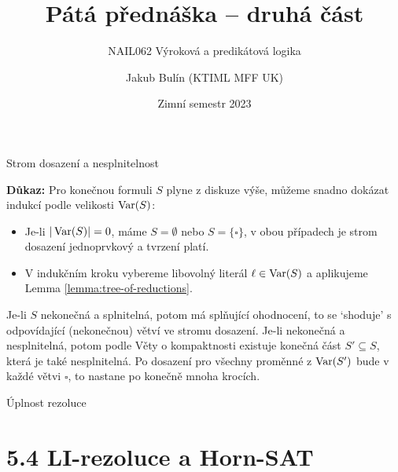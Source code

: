 \documentclass{beamer}
\title{Pátá přednáška -- druhá část}
\subtitle{NAIL062 Výroková a predikátová logika}
\author{Jakub Bulín (KTIML MFF UK)}
\date{Zimní semestr 2023}
\begin{document}
\begin{frame}{Strom dosazení a nesplnitelnost}
    


    \textbf{Důkaz:} 
        Pro konečnou formuli $S$ plyne z diskuze výše, můžeme snadno dokázat indukcí podle velikosti $\operatorname{Var}(S)$: 
        \begin{itemize}
            \item Je-li $|\operatorname{Var}(S)|=0$, máme $S=\emptyset$ nebo $S=\{\square\}$, v obou případech je strom dosazení jednoprvkový a tvrzení platí. 
            \item V indukčním kroku vybereme libovolný literál $\ell\in\operatorname{Var}(S)$ a aplikujeme Lemma \ref{lemma:tree-of-reductions}.
        \end{itemize} 
    Je-li $S$ nekonečná a splnitelná, potom má splňující ohodnocení, to se `shoduje' s odpovídající (nekonečnou) větví ve stromu dosazení. Je-li nekonečná a nesplnitelná, potom podle Věty o kompaktnosti existuje konečná část $S'\subseteq S$, která je také nesplnitelná. Po dosazení pro všechny proměnné z $\operatorname{Var}(S')$ bude v každé větvi $\square$, to nastane po konečně mnoha krocích.
    \hfill\qedsymbol

\end{frame}



\begin{frame}{Úplnost rezoluce}

\end{frame}


\section{5.4 LI-rezoluce a Horn-SAT}
\end{document}
